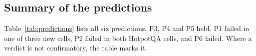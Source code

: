 

\subsection{Summary of the predictions}
Table~\ref{tab:predictions} lists all six predictions. P3, P4 and P5 held. P1 failed in one of three new cells, P2 failed in both HotpotQA cells, and P6 failed. Where a verdict is not confirmatory, the table marks it.


